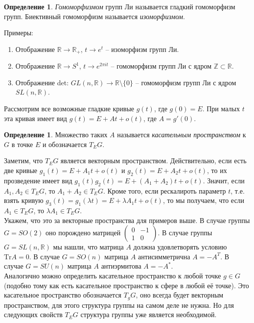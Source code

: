 \documentclass[12pt]{article}
\theoremstyle{definition}
\newtheorem{defin}[theorem]{Определение}
\begin{document}
\begin{defin}
\textit{Гомоморфизмом} групп Ли называется гладкий гомоморфизм групп. Биективный гомоморфизм называется \textit{изоморфизмом}.
\end{defin}
Примеры:
\begin{enumerate}
    \item Отображение $\mathbb{R}\rightarrow\mathbb{R}_+$, $t\rightarrow e^t$ -- изоморфизм групп Ли.
    \item Отображение $\mathbb{R}\rightarrow S^1$, $t \rightarrow e^{2\pi it}$ -- гомоморфизм групп Ли с ядром $\mathbb{Z} \subset \mathbb{R}$.
    \item Отображение det: $GL(n,\mathbb{R})\rightarrow \mathbb{R}\setminus\{0\}$ -- гомоморфизм групп Ли с ядром $SL(n,\mathbb{R})$.
\end{enumerate}
Рассмотрим все возможные гладкие кривые $g(t)$, где $g(0)=E$. При малых $t$ эта кривая имеет вид $g(t)=E+At+o(t)$, где $A=g'(0)$.
\begin{defin}
Множество таких $A$ называется \textit{касательным пространством} к $G$ в точке $E$ и обозначается $T_EG$. 
\end{defin}
Заметим, что $T_EG$ является векторным пространством. Действительно, если есть две кривые $g_1(t)=E+A_1t+o(t)$ и $g_2(t)=E+A_2t+o(t)$, то их прозведение имеет вид $g_1(t)g_2(t)=E+(A_1+A_2)t+o(t)$. Значит, если $A_1,A_2\in T_E G$, то $A_1+A_2\in T_EG$. Кроме того, если рескалироть параметр $t$, т.е. взять кривую $g_3(t)=g_1(\lambda t)=E+\lambda A_1t+o(t)$, то мы получаем, что если $A_1\in T_EG$, то $\lambda A_1\in T_EG$.\\
Укажем, что это за векторные пространства для примеров выше. В случае группы $G=SO(2)$ оно порождено матрицей $\begin{pmatrix}
0 & -1\\
1 & 0
\end{pmatrix}$. В случае группы $G=SL(n,\mathbb{R})$ мы нашли, что матрица $A$ должна удовлетворять условию $\text{Tr}A = 0$. В случае $G = SO(n)$ матрица $A$ антисимметрична $A=-A^T$. В случае $G = SU(n)$ матрица $A$ антиэрмитова $A=-A^*$.\\
Аналогично можно определить касательное пространство к любой точке $g\in G$ (подобно тому как есть касательное пространство к сфере в любой её точке). Это касательное пространство обозначается $T_gG$, оно всегда будет векторным пространством, для этого структура группы на самом деле не нужна. Но для следующих свойств $T_EG$ структура группы уже является необходимой.\\
\end{document}
